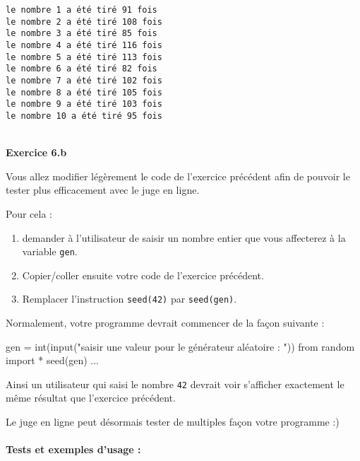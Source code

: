 \documentclass[a4paper,17pt]{extarticle}
\newenvironment{eleve}%
{\begin{activite}\color{noiramu}\\[-0.5cm]}
{\end{activite}}
\providecommand{\tightlist}{%
      \setlength{\itemsep}{0pt}\setlength{\parskip}{0pt}}
\newenvironment{Shaded}{}{}
\newcommand{\StringTok}[1]{\textcolor[rgb]{0.25,0.44,0.63}{{#1}}}
\newcommand{\NormalTok}[1]{{#1}}
\newcommand{\ImportTok}[1]{{#1}}
\newcommand{\OperatorTok}[1]{\textcolor[rgb]{0.40,0.40,0.40}{{#1}}}
\newcommand{\BuiltInTok}[1]{{#1}}
\begin{document}
    \begin{Verbatim}[commandchars=\\\{\}]
le nombre 1 a été tiré 91 fois
le nombre 2 a été tiré 108 fois
le nombre 3 a été tiré 85 fois
le nombre 4 a été tiré 116 fois
le nombre 5 a été tiré 113 fois
le nombre 6 a été tiré 82 fois
le nombre 7 a été tiré 102 fois
le nombre 8 a été tiré 105 fois
le nombre 9 a été tiré 103 fois
le nombre 10 a été tiré 95 fois
    \end{Verbatim}
\begin{eleve}
    \textbf{Exercice 6.b}

Vous allez modifier légèrement le code de l'exercice précédent afin de
pouvoir le tester plus efficacement avec le juge en ligne.

Pour cela :

\begin{enumerate}
\def\labelenumi{\arabic{enumi}.}
\tightlist
\item
  demander à l'utilisateur de saisir un nombre entier que vous
  affecterez à la variable \texttt{gen}.
\item
  Copier/coller ensuite votre code de l'exercice précédent.
\item
  Remplacer l'instruction \texttt{seed(42)} par \texttt{seed(gen)}.
\end{enumerate}

Normalement, votre programme devrait commencer de la façon suivante :

\begin{Shaded}
\begin{Highlighting}[]
\NormalTok{gen }\OperatorTok{=} \BuiltInTok{int}\NormalTok{(}\BuiltInTok{input}\NormalTok{(}\StringTok{"saisir une valeur pour le générateur aléatoire : "}\NormalTok{))}
\ImportTok{from}\NormalTok{ random }\ImportTok{import} \OperatorTok{*}
\NormalTok{seed(gen)}
\NormalTok{...}
\end{Highlighting}
\end{Shaded}

Ainsi un utilisateur qui saisi le nombre \texttt{42} devrait voir
s'afficher exactement le même résultat que l'exercice précédent.

Le juge en ligne peut désormais tester de multiples façon votre
programme :)

\hypertarget{tests-et-exemples-dusage}{%
\paragraph{Tests et exemples d'usage :}\label{tests-et-exemples-dusage}}


\end{eleve}
\end{document}
